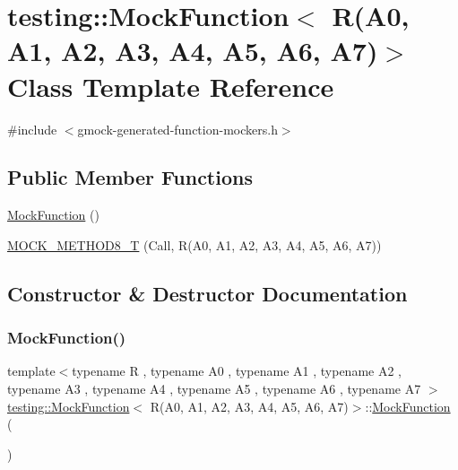 \hypertarget{classtesting_1_1MockFunction_3_01R_07A0_00_01A1_00_01A2_00_01A3_00_01A4_00_01A5_00_01A6_00_01A7_08_4}{}\section{testing\+::Mock\+Function$<$ R(A0, A1, A2, A3, A4, A5, A6, A7)$>$ Class Template Reference}
\label{classtesting_1_1MockFunction_3_01R_07A0_00_01A1_00_01A2_00_01A3_00_01A4_00_01A5_00_01A6_00_01A7_08_4}


{\ttfamily \#include $<$gmock-\/generated-\/function-\/mockers.\+h$>$}

\subsection*{Public Member Functions}
\begin{DoxyCompactItemize}
\item 
\mbox{\hyperlink{classtesting_1_1MockFunction_3_01R_07A0_00_01A1_00_01A2_00_01A3_00_01A4_00_01A5_00_01A6_00_01A7_08_4_ab2ac033046600396f088321ef0508e63}{Mock\+Function}} ()
\item 
\mbox{\hyperlink{classtesting_1_1MockFunction_3_01R_07A0_00_01A1_00_01A2_00_01A3_00_01A4_00_01A5_00_01A6_00_01A7_08_4_a895c470e00e07294ab42c09588ae1e4c}{M\+O\+C\+K\+\_\+\+M\+E\+T\+H\+O\+D8\+\_\+T}} (Call, R(A0, A1, A2, A3, A4, A5, A6, A7))
\end{DoxyCompactItemize}


\subsection{Constructor \& Destructor Documentation}
\mbox{\label{classtesting_1_1MockFunction_3_01R_07A0_00_01A1_00_01A2_00_01A3_00_01A4_00_01A5_00_01A6_00_01A7_08_4_ab2ac033046600396f088321ef0508e63}} 
\subsubsection{\texorpdfstring{MockFunction()}{MockFunction()}}
{\footnotesize\ttfamily template$<$typename R , typename A0 , typename A1 , typename A2 , typename A3 , typename A4 , typename A5 , typename A6 , typename A7 $>$ \\
\mbox{\hyperlink{classtesting_1_1MockFunction}{testing\+::\+Mock\+Function}}$<$ R(A0, A1, A2, A3, A4, A5, A6, A7)$>$\+::\mbox{\hyperlink{classtesting_1_1MockFunction}{Mock\+Function}} (\begin{DoxyParamCaption}{ }\end{DoxyParamCaption})\hspace{0.3cm}{\ttfamily [inline]}}



